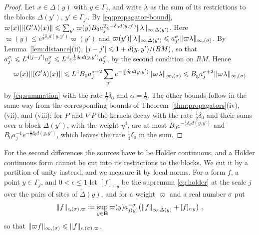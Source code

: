 \documentclass[11pt]{preprint}
\DeclarePairedDelimiter{\abs}{\lvert}{\rvert}
\DeclarePairedDelimiter{\norm}{\lVert}{\rVert}
\numberwithin{equation}{section}
\begin{document}
\begin{proof}
Let $x \in \Delta(y)$ with $y \in \Gamma_j$, and write $\lambda$ as the sum of its restrictions to the blocks $\Delta(y')$, $y' \in \Gamma_{j'}$. By \eqref{eq:propagator-bound}, $\varpi(x)\norm{(G'\lambda)(x)} \leqslant \sum_{y'}\varpi(y)B_0a_j^2e^{-\delta_0d(y, y')}\norm\lambda_{\infty,\Delta(y')}$. Here $\varpi(y) \leqslant e^{\frac{1}{8}\delta_0d(y, y')}\varpi(y')$ and $\varpi(y')\norm\lambda_{\infty,\Delta(y')} \leqslant a_{j'}^\sigma\norm{\varpi\lambda}_{\infty,(\sigma)}$. By Lemma~\ref{lem:distance}(ii), $\abs{j - j'} \leqslant 1 + d(y, y')/(RM)$, so that $a_{j'}^\sigma \leqslant L^{4\abs{j-j'}}a_j^\sigma \leqslant L^4e^{\frac{1}{8}\delta_0d(y, y')}a_j^\sigma$, by the second condition on $RM$. Hence
\[
    \varpi(x)\norm{(G'\lambda)(x)} \leqslant L^4B_0a_j^{\sigma+2}\sum_{y'}e^{-\frac{3}{4}\delta_0d(y, y')}\norm{\varpi\lambda}_{\infty,(\sigma)} \leqslant B_{\mathrm g}a_j^{\sigma+2}\norm{\varpi\lambda}_{\infty,(\sigma)}
\]
by \eqref{eq:summation} with the rate $\frac{1}{2}\delta_0$ and $\alpha = \frac{1}{2}$. The other bounds follow in the same way from the corresponding bounds of Theorem~\ref{thm:propagators}(iv), (vii), and (viii); for $P$ and $\nabla P$ the kernels decay with the rate $\frac{1}{2}\delta_0$ and their sums over a block $\Delta(y')$, with the weight $\eta^4$, are at most $B_0e^{-\frac{1}{2}\delta_0d(y, y')}$ and $B_0a_j^{-1}e^{-\frac{1}{2}\delta_0d(y, y')}$, which leaves the rate $\frac{1}{4}\delta_0$ in the sum.
\end{proof}

For the second differences the sources have to be H\"older continuous, and a H\"older continuous form cannot be cut into its restrictions to the blocks. We cut it by a partition of unity instead, and we measure it by local norms. For a form $f$, a point $y \in \Gamma_j$, and $0 < \epsilon \leqslant 1$ let $[f]_{\epsilon;y}$ be the supremum \eqref{eq:holder} at the scale $j$ over the pairs of sites of $\tilde\Delta(y)$, and for a weight $\varpi$ and a real number $\sigma$ put
\begin{equation}\label{eq:local-holder-norm}
    \norm f_{\epsilon,(\sigma),\varpi} \coloneqq \sup_{y \in \mathbf B}\varpi(y)a_{j(y)}^{-\sigma}\bigl(\norm f_{\infty,\tilde\Delta(y)} + [f]_{\epsilon;y}\bigr)\;,
\end{equation}
so that $\norm{\varpi f}_{\infty,(\sigma)} \leqslant \norm f_{\epsilon,(\sigma),\varpi}$.
\end{document}
